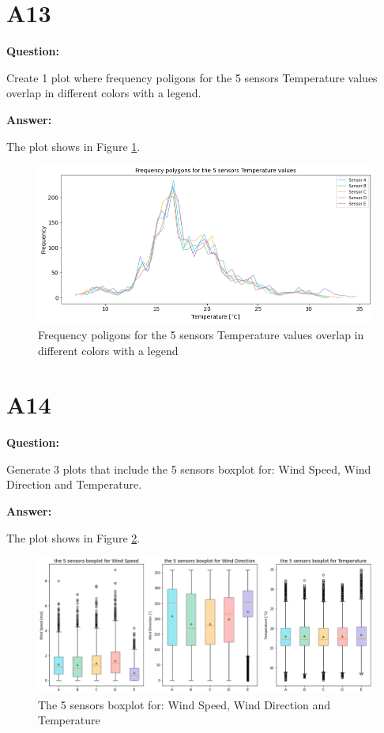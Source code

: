 \documentclass[a4paper]{article}
\numberwithin{figure}{section}
\numberwithin{table}{section}
\begin{document}
\section{A13}

\textbf{Question:}

Create 1 plot where frequency poligons for the 5 sensors Temperature values overlap in different colors with a legend.

\textbf{Answer:}

The plot shows in Figure \ref{Fig:A13}.

\begin{figure}
\centering
\includegraphics[scale=0.38]{Figures/figA13.png}
\caption{Frequency poligons for the 5 sensors Temperature values overlap in different colors with a legend}

\label{Fig:A13}
\end{figure}

\section{A14}

\textbf{Question:}

Generate 3 plots that include the 5 sensors boxplot for: Wind Speed, Wind Direction and Temperature.

\textbf{Answer:}

The plot shows in Figure \ref{Fig:A14}.

\begin{figure}
\centering
\includegraphics[scale=0.38]{Figures/figA14.png}
\caption{The 5 sensors boxplot for: Wind Speed, Wind Direction and Temperature}

\label{Fig:A14}
\end{figure}
\end{document}
